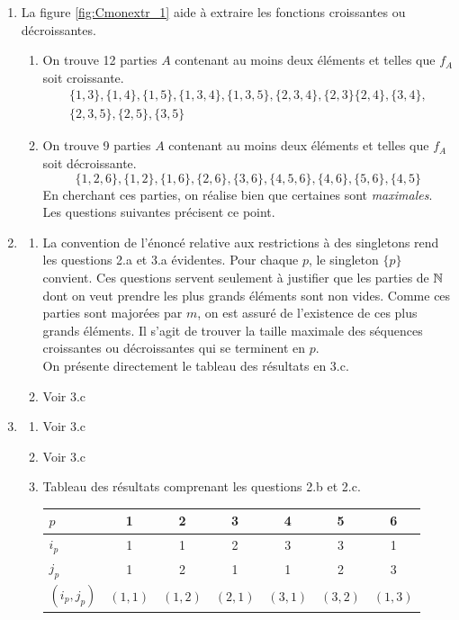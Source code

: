 \begin{enumerate}
 \item La figure \ref{fig:Cmonextr_1} aide à extraire les fonctions croissantes ou décroissantes.
\begin{enumerate}
 \item On trouve 12 parties $A$ contenant au moins deux éléments et telles que $f_A$ soit croissante. 
\begin{multline*}
 \{1,3\}, \{1,4\}, \{1,5\}, \{1,3,4\}, \{1,3,5\}, \{2,3,4\}, \{2,3\}\{2,4\}, \{3,4\},\\
 \{2,3,5\}, \{2,5\}, \{3,5\}
\end{multline*}
\item On trouve 9 parties $A$ contenant au moins deux éléments et telles que $f_A$ soit décroissante.
\begin{displaymath}
 \{1,2,6\},\{1,2\},\{1,6\},\{2,6\},\{3,6\},\{4,5,6\},\{4,6\},\{5,6\},\{4,5\}
\end{displaymath}
En cherchant ces parties, on réalise bien que certaines sont \emph{maximales}. Les questions suivantes précisent ce point.
\end{enumerate}
\item \begin{enumerate}
 \item La convention de l'énoncé relative aux restrictions à des singletons rend les questions 2.a et 3.a  évidentes. Pour chaque $p$, le singleton $\{p\}$ convient. Ces questions servent seulement à justifier que les parties de $\mathbb{N}$ dont on veut prendre les plus grands éléments sont non vides. Comme ces parties sont majorées par $m$, on est assuré de l'existence de ces plus grands éléments. Il s'agit de trouver la taille maximale des séquences croissantes ou décroissantes qui se terminent en $p$. \\
On présente directement le tableau des résultats en 3.c.
\item Voir 3.c
\end{enumerate}
\item \begin{enumerate}
 \item Voir 3.c 
\item Voir 3.c
\item Tableau des résultats comprenant les questions 2.b et 2.c.
\begin{center}
\renewcommand{\arraystretch}{1.3}
\begin{tabular}{|l|c|c|c|c|c|c|}  \hline 
$p$ & 1 & 2 & 3 & 4 & 5 & 6 \\ \hline 
$i_p$ & 1 & 1 & 2 & 3 & 3 & 1 \\  \hline 
$j_p$ & 1 & 2 & 1 & 1 & 2 & 3 \\ \hline
$(i_p,j_p)$ & $(1,1)$ & $(1,2)$ & $(2,1)$ & $(3,1)$ & $(3,2)$ & $(1,3)$ \\ \hline
\end{tabular}
\end{center}
\hspace{.3cm}
\end{enumerate}


\end{enumerate}
